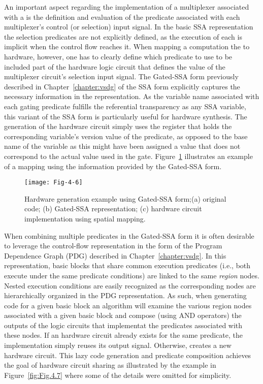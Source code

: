 An important aspect regarding the implementation of a multiplexer 
associated with a \phifun is the definition and evaluation 
of the predicate associated with each multiplexer's control (or
selection) input signal.
In the basic SSA representation the selection predicates are
not explicitly defined, as the execution of each \phifun
is implicit when the control flow reaches it. 
When mapping a computation the \phifun to hardware,
however, one has to clearly define which predicate to use to be
included part of the hardware logic circuit that defines the value
of the multiplexer circuit's selection input signal. 
The Gated-SSA form previously described in Chapter~\ref{chapter:vsdg} of the SSA form
explicitly captures the necessary information in the representation. 
As the variable name associated with each gating predicate fulfills the referential transparency as any  SSA variable, 
this variant of the SSA form is particularly useful for hardware synthesis. 
The generation of the hardware circuit simply uses the 
register that holds the corresponding variable's version value of the predicate,
as opposed
to the base name of the variable as this might have been assigned a
value that does not correspond to the actual value used in the gate.
Figure~\ref{fig:Fig.4.6} illustrates an example of a mapping using the
information provided by the Gated-SSA form.\\

\begin{figure}[htbp]
\centering
\texttt{[image: Fig-4-6]}
\caption{Hardware generation example using Gated-SSA form;\newline (a) original 
code; (b) Gated-SSA representation; (c) hardware circuit implementation 
using spatial mapping.}
\label{fig:Fig.4.6}
\end{figure}

When combining multiple predicates in the Gated-SSA form it is often
desirable to leverage the control-flow representation in the form of the
Program Dependence Graph (PDG) described in Chapter~\ref{chapter:vsdg}.
In this representation, basic blocks
that share common execution predicates (i.e., both execute under
the same predicate conditions) are linked to the same {\em region} 
nodes. Nested execution conditions are easily
recognized as the corresponding nodes are hierarchically organized
in the PDG representation.
As such, when generating code for a given basic block an algorithm
will examine the various region nodes associated with a given basic
block and compose (using AND operators) the outputs of the logic 
circuits that implementat the predicates associated with these nodes.
If an hardware circuit already exists for the same predicate, the 
implementation simply reuses its output signal.
Otherwise, creates a new hardware circuit.
This lazy code generation and predicate composition achieves the
goal of hardware circuit sharing as illustrated by the example in 
Figure~\ref{fig:Fig.4.7} where some of the details were omitted for
simplicity.\\

